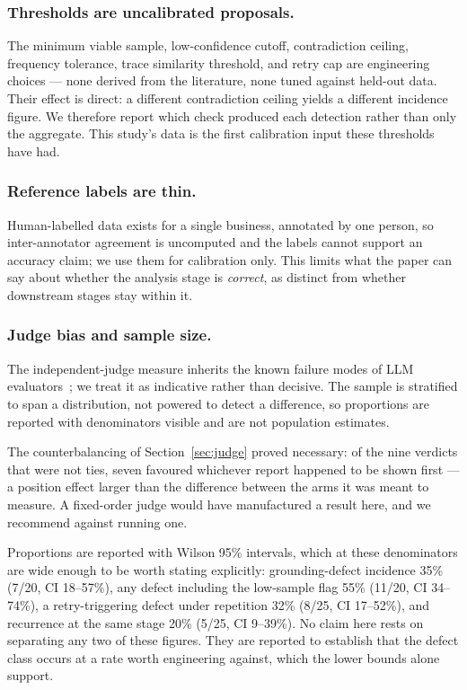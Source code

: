 \documentclass[runningheads]{llncs}
\begin{document}
\subsubsection{Thresholds are uncalibrated proposals.}
The minimum viable sample, low-confidence cutoff, contradiction ceiling,
frequency tolerance, trace similarity threshold, and retry cap are engineering
choices --- none derived from the literature, none tuned against held-out data.
Their effect is direct: a different contradiction ceiling yields a different
incidence figure. We therefore report which check produced each detection rather
than only the aggregate. This study's data is the first calibration input these
thresholds have had.

\subsubsection{Reference labels are thin.}
Human-labelled data exists for a single business, annotated by one person, so
inter-annotator agreement is uncomputed and the labels cannot support an accuracy
claim; we use them for calibration only. This limits what the paper can say about
whether the analysis stage is \emph{correct}, as distinct from whether downstream
stages stay within it.

\subsubsection{Judge bias and sample size.}
The independent-judge measure inherits the known failure modes of LLM
evaluators~\cite{positionbias,selfpreference}; we treat it as indicative rather
than decisive. The sample is stratified to span a distribution, not powered to
detect a difference, so proportions are reported with denominators visible and are
not population estimates.

The counterbalancing of Section~\ref{sec:judge} proved necessary: of the nine
verdicts that were not ties, seven favoured whichever report happened to be shown
first --- a position effect larger than the difference between the arms it was
meant to measure. A fixed-order judge would have manufactured a result here, and
we recommend against running one.

Proportions are reported with Wilson 95\% intervals, which at these denominators
are wide enough to be worth stating explicitly: grounding-defect incidence
35\% (7/20, CI 18--57\%), any defect including the low-sample flag 55\% (11/20,
CI 34--74\%), a retry-triggering defect under repetition 32\% (8/25, CI
17--52\%), and recurrence at the same stage 20\% (5/25, CI 9--39\%). No claim
here rests on separating any two of these figures. They are reported to
establish that the defect class occurs at a rate worth engineering against,
which the lower bounds alone support.
\end{document}
